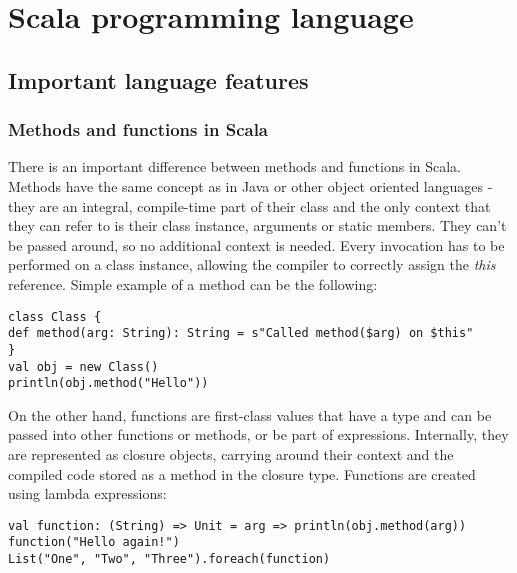 \chapter{Scala programming language}

\section{Important language features}




\subsection{Methods and functions in Scala}
\label{subsec:metandfun}

There is an important difference between methods and functions in Scala. Methods have the same concept as in Java or other object oriented languages - they are an integral, compile-time part of their class and the only context that they can refer to is their class instance, arguments or static members. They can't be passed around, so no additional context is needed. Every invocation has to be performed on a class instance, allowing the compiler to correctly assign the \textit{this} reference. Simple example of a method can be the following:

\lstset{style=Scala}
\begin{lstlisting}
class Class {
def method(arg: String): String = s"Called method($arg) on $this"
}
val obj = new Class()
println(obj.method("Hello"))
\end{lstlisting}

On the other hand, functions are first-class values that have a type and can be passed into other functions or methods, or be part of expressions. Internally, they are represented as closure objects, carrying around their context and the compiled code stored as a method in the closure type. Functions are created using lambda expressions:

\lstset{style=Scala}
\begin{lstlisting}
val function: (String) => Unit = arg => println(obj.method(arg))
function("Hello again!")
List("One", "Two", "Three").foreach(function)
\end{lstlisting}

